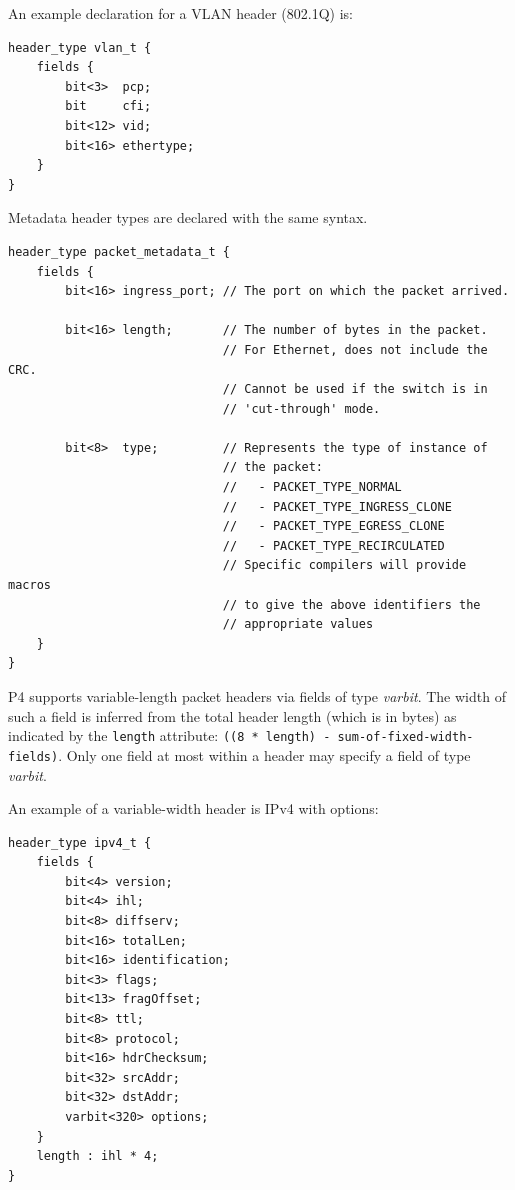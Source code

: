 \documentclass[12pt]{article}
\begin{document}
An example declaration for a VLAN header (802.1Q) is:

\begin{lstlisting}[style=P4style]
header_type vlan_t {
    fields {
        bit<3>  pcp;
        bit     cfi;
        bit<12> vid;
        bit<16> ethertype;
    }
}
\end{lstlisting}

Metadata header types are declared with the same syntax.

\begin{lstlisting}[style=P4style]
header_type packet_metadata_t {
    fields {
        bit<16> ingress_port; // The port on which the packet arrived.

        bit<16> length;       // The number of bytes in the packet. 
                              // For Ethernet, does not include the CRC. 
                              // Cannot be used if the switch is in
                              // 'cut-through' mode.

        bit<8>  type;         // Represents the type of instance of
                              // the packet: 
                              //   - PACKET_TYPE_NORMAL
                              //   - PACKET_TYPE_INGRESS_CLONE
                              //   - PACKET_TYPE_EGRESS_CLONE
                              //   - PACKET_TYPE_RECIRCULATED
                              // Specific compilers will provide macros
                              // to give the above identifiers the
                              // appropriate values
    }
}
\end{lstlisting}

P4 supports variable-length packet headers via fields of type \textit{varbit}.
The width of such a field is inferred from the total header length (which
is in bytes) as indicated by the \texttt{length} attribute: \texttt{((8 *
length) - sum-of-fixed-width-fields)}. Only one field at most within a header
may specify a field of type \textit{varbit}.

An example of a variable-width header is IPv4 with options:

\begin{lstlisting}[style=P4style]
header_type ipv4_t {
    fields {
        bit<4> version;
        bit<4> ihl;
        bit<8> diffserv;
        bit<16> totalLen;
        bit<16> identification;
        bit<3> flags;
        bit<13> fragOffset;
        bit<8> ttl;
        bit<8> protocol;
        bit<16> hdrChecksum;
        bit<32> srcAddr;
        bit<32> dstAddr;
        varbit<320> options;
    }
    length : ihl * 4;
}
\end{lstlisting}
\end{document}
